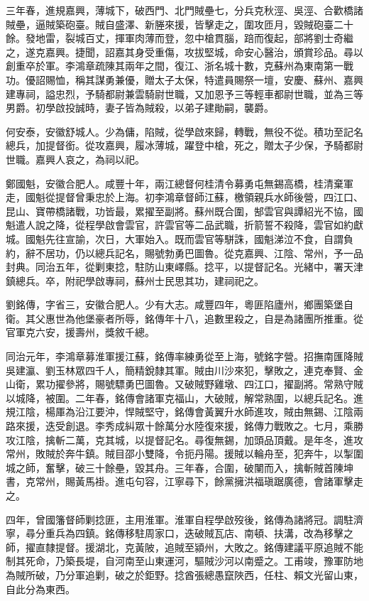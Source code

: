 \begin{pinyinscope}
三年春，進規嘉興，薄城下，破西門、北門賊壘七，分兵克秋涇、吳涇、合歡橋諸賊壘，逼賊築砲臺。賊自盛澤、新塍來援，皆擊走之，圍攻匝月，毀賊砲臺二十餘。發地雷，裂城百丈，揮軍肉薄而登，忽中槍貫腦，踣而復起，部將劉士奇繼之，遂克嘉興。捷聞，詔嘉其身受重傷，攻拔堅城，命安心醫治，頒賞珍品。尋以創重卒於軍。李鴻章疏陳其兩年之間，復江、浙名城十數，克蘇州為東南第一戰功。優詔賜恤，稱其謀勇兼優，贈太子太保，特遣員賜祭一壇，安慶、蘇州、嘉興建專祠，謚忠烈，予騎都尉兼雲騎尉世職，又加恩予三等輕車都尉世職，並為三等男爵。初學啟投誠時，妻子皆為賊殺，以弟子建勛嗣，襲爵。

何安泰，安徽舒城人。少為傭，陷賊，從學啟來歸，轉戰，無役不從。積功至記名總兵，加提督銜。從攻嘉興，履冰薄城，躍登中槍，死之，贈太子少保，予騎都尉世職。嘉興人哀之，為祠以祀。

鄭國魁，安徽合肥人。咸豐十年，兩江總督何桂清令募勇屯無錫高橋，桂清棄軍走，國魁從提督曾秉忠於上海。初李鴻章督師江蘇，檄領親兵水師後營，四江口、昆山、寶帶橋諸戰，功皆最，累擢至副將。蘇州既合圍，郜雲官與譚紹光不協，國魁遣人說之降，從程學啟會雲官，許雲官等二品武職，折箭誓不殺降，雲官如約獻城。國魁先往宣諭，次日，大軍始入。既而雲官等駢誅，國魁涕泣不食，自謂負約，辭不居功，仍以總兵記名，賜號勃勇巴圖魯。從克嘉興、江陰、常州，予一品封典。同治五年，從剿東捻，駐防山東嶧縣。捻平，以提督記名。光緒中，署天津鎮總兵。卒，附祀學啟專祠，蘇州士民思其功，建祠祀之。

劉銘傳，字省三，安徽合肥人。少有大志。咸豐四年，粵匪陷廬州，鄉團築堡自衛。其父惠世為他堡豪者所辱，銘傳年十八，追數里殺之，自是為諸團所推重。從官軍克六安，援壽州，獎敘千總。

同治元年，李鴻章募淮軍援江蘇，銘傳率練勇從至上海，號銘字營。招撫南匯降賊吳建瀛、劉玉林眾四千人，簡精銳隸其軍。賊由川沙來犯，擊敗之，連克奉賢、金山衛，累功擢參將，賜號驃勇巴圖魯。又破賊野雞墩、四江口，擢副將。常熟守賊以城降，被圍。二年春，銘傳會諸軍克福山，大破賊，解常熟圍，以總兵記名。進規江陰，楊厙為沿江要沖，悍賊堅守，銘傳會黃翼升水師進攻，賊由無錫、江陰兩路來援，迭受創退。李秀成糾眾十餘萬分水陸復來援，銘傳力戰敗之。七月，乘勝攻江陰，擒斬二萬，克其城，以提督記名。尋復無錫，加頭品頂戴。是年冬，進攻常州，敗賊於奔牛鎮。賊目邵小雙降，令扼丹陽。援賊以輪舟至，犯奔牛，以掣圍城之師，奮擊，破三十餘壘，毀其舟。三年春，合圍，破闉而入，擒斬賊首陳坤書，克常州，賜黃馬褂。進屯句容，江寧尋下，餘黨擁洪福瑱踞廣德，會諸軍擊走之。

四年，曾國籓督師剿捻匪，主用淮軍。淮軍自程學啟歿後，銘傳為諸將冠。調駐濟寧，尋分重兵為四鎮。銘傳移駐周家口，迭破賊瓦店、南頓、扶溝，改為移擊之師，擢直隸提督。援湖北，克黃陂，追賊至潁州，大敗之。銘傳建議平原追賊不能制其死命，乃築長堤，自河南至山東運河，驅賊沙河以南蹙之。工甫竣，豫軍防地為賊所破，乃分軍追剿，破之於鉅野。捻酋張總愚竄陜西，任柱、賴文光留山東，自此分為東西。


\end{pinyinscope}
